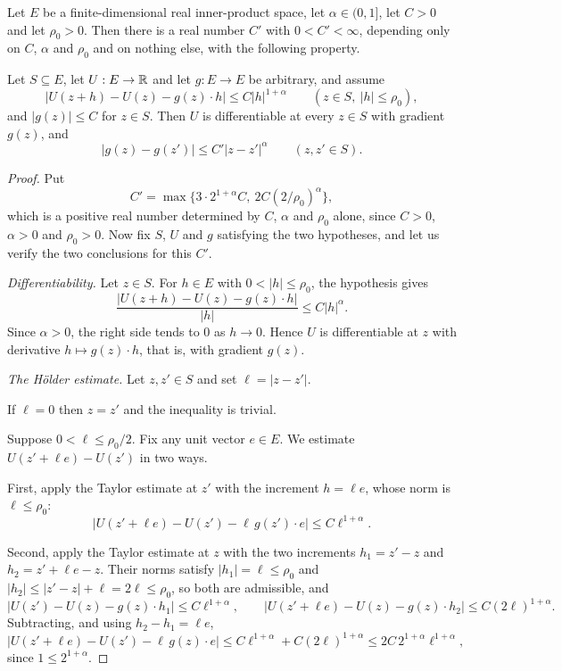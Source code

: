 \begin{lemma}
Let $E$ be a finite-dimensional real inner-product space, let
$\alpha\in(0,1]$, let $C>0$ and let $\rho_0>0$. Then there is a real number
$C'$ with $0<C'<\infty$, depending only on $C$, $\alpha$ and $\rho_0$ and on
nothing else, with the following property.

Let $S\subseteq E$, let $U:E\to\mathbb{R}$ and let $g:E\to E$ be arbitrary, and assume
\[
  |U(z+h)-U(z)-g(z)\cdot h|\le C|h|^{1+\alpha}
  \qquad(z\in S,\ |h|\le\rho_0),
\]
and $|g(z)|\le C$ for $z\in S$. Then $U$ is differentiable at every $z\in S$
with gradient $g(z)$, and
\[
  |g(z)-g(z')|\le C'|z-z'|^\alpha\qquad(z,z'\in S).
\]
\end{lemma}
\begin{proof}
Put
\[
  C'=\max\{3\cdot2^{1+\alpha}C,\ 2C(2/\rho_0)^\alpha\},
\]
which is a positive real number determined by $C$, $\alpha$ and $\rho_0$ alone,
since $C>0$, $\alpha>0$ and $\rho_0>0$. Now fix $S$, $U$ and $g$ satisfying the
two hypotheses, and let us verify the two conclusions for this $C'$.

\emph{Differentiability.}
Let $z\in S$. For $h\in E$ with $0<|h|\le\rho_0$, the hypothesis gives
\[
  \frac{|U(z+h)-U(z)-g(z)\cdot h|}{|h|}\le C|h|^\alpha .
\]
Since $\alpha>0$, the right side tends to $0$ as $h\to0$. Hence $U$ is
differentiable at $z$ with derivative $h\mapsto g(z)\cdot h$, that is, with
gradient $g(z)$.

\emph{The Hölder estimate.}
Let $z,z'\in S$ and set $\ell=|z-z'|$.

If $\ell=0$ then $z=z'$ and the inequality is trivial.

Suppose $0<\ell\le\rho_0/2$. Fix any unit vector $e\in E$. We estimate
$U(z'+\ell e)-U(z')$ in two ways.

First, apply the Taylor estimate at $z'$ with the increment $h=\ell e$, whose
norm is $\ell\le\rho_0$:
\begin{equation}\label{eq:tth-at-zp}
  \bigl|U(z'+\ell e)-U(z')-\ell\,g(z')\cdot e\bigr|\le C\ell^{1+\alpha}.
\end{equation}

Second, apply the Taylor estimate at $z$ with the two increments $h_1=z'-z$ and
$h_2=z'+\ell e-z$. Their norms satisfy $|h_1|=\ell\le\rho_0$ and
$|h_2|\le|z'-z|+\ell=2\ell\le\rho_0$, so both are admissible, and
\[
  \bigl|U(z')-U(z)-g(z)\cdot h_1\bigr|\le C\ell^{1+\alpha},
  \qquad
  \bigl|U(z'+\ell e)-U(z)-g(z)\cdot h_2\bigr|\le C(2\ell)^{1+\alpha}.
\]
Subtracting, and using $h_2-h_1=\ell e$,
\begin{equation}\label{eq:tth-at-z}
  \bigl|U(z'+\ell e)-U(z')-\ell\,g(z)\cdot e\bigr|
    \le C\ell^{1+\alpha}+C(2\ell)^{1+\alpha}
    \le 2C\,2^{1+\alpha}\ell^{1+\alpha},
\end{equation}
since $1\le2^{1+\alpha}$.


\end{proof}
